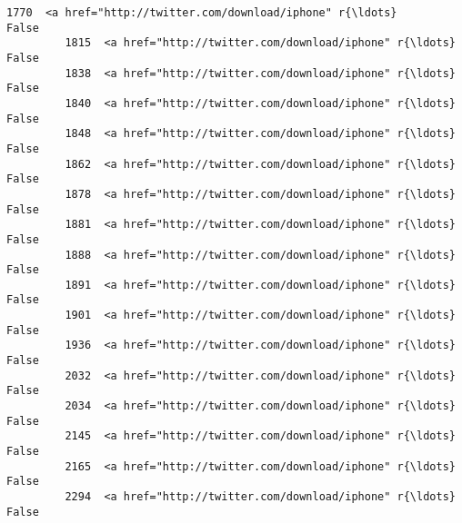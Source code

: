 \documentclass[11pt]{article}
\begin{document}
\begin{Verbatim}[commandchars=\\\{\}]
         1770  <a href="http://twitter.com/download/iphone" r{\ldots}      False   
         1815  <a href="http://twitter.com/download/iphone" r{\ldots}      False   
         1838  <a href="http://twitter.com/download/iphone" r{\ldots}      False   
         1840  <a href="http://twitter.com/download/iphone" r{\ldots}      False   
         1848  <a href="http://twitter.com/download/iphone" r{\ldots}      False   
         1862  <a href="http://twitter.com/download/iphone" r{\ldots}      False   
         1878  <a href="http://twitter.com/download/iphone" r{\ldots}      False   
         1881  <a href="http://twitter.com/download/iphone" r{\ldots}      False   
         1888  <a href="http://twitter.com/download/iphone" r{\ldots}      False   
         1891  <a href="http://twitter.com/download/iphone" r{\ldots}      False   
         1901  <a href="http://twitter.com/download/iphone" r{\ldots}      False   
         1936  <a href="http://twitter.com/download/iphone" r{\ldots}      False   
         2032  <a href="http://twitter.com/download/iphone" r{\ldots}      False   
         2034  <a href="http://twitter.com/download/iphone" r{\ldots}      False   
         2145  <a href="http://twitter.com/download/iphone" r{\ldots}      False   
         2165  <a href="http://twitter.com/download/iphone" r{\ldots}      False   
         2294  <a href="http://twitter.com/download/iphone" r{\ldots}      False   
         

\end{Verbatim}
\end{document}
